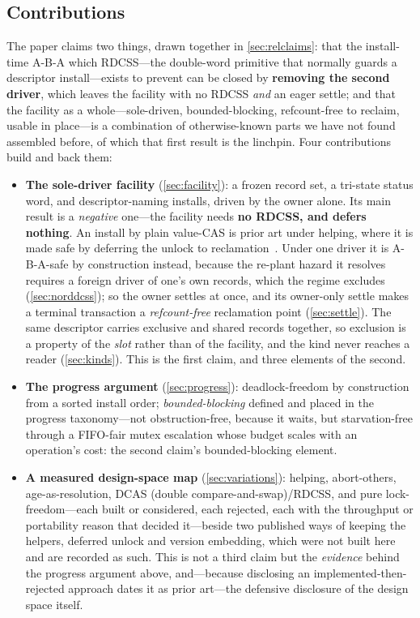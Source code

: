 \documentclass[11pt]{article}
\begin{document}
\subsection*{Contributions}

The paper claims two things, drawn together in \cref{sec:relclaims}: that the
install-time A-B-A which RDCSS---the double-word primitive that normally guards
a descriptor install---exists to prevent can be closed by \textbf{removing the
second driver}, which leaves the facility with no RDCSS \emph{and} an eager
settle; and that the facility as a
whole---sole-driven, bounded-blocking, refcount-free to reclaim, usable in
place---is a combination of otherwise-known parts we have not found assembled
before, of which that first result is the linchpin. Four contributions build and
back them:

\begin{itemize}
\item \textbf{The sole-driver \mcas facility} (\cref{sec:facility}): a frozen record
      set, a tri-state status word, and descriptor-naming installs, driven by
      the owner alone. Its main result is a \emph{negative} one---the facility
      needs \textbf{no RDCSS, and defers nothing}. An install by plain value-CAS
      is prior art under helping, where it is made safe by deferring the unlock
      to reclamation~\citep{guerraoui2020mcas}. Under one driver it is
      A-B-A-safe by construction instead, because
      the re-plant hazard it resolves requires a foreign driver of one's own
      records, which the regime excludes (\cref{sec:norddcss}); so the owner
      settles at once, and its owner-only
      settle makes a terminal transaction a \emph{refcount-free} reclamation point
      (\cref{sec:settle}). The same descriptor carries exclusive and shared
      records together, so exclusion is a property of the \emph{slot} rather than
      of the facility, and the kind never reaches a reader (\cref{sec:kinds}).
      This is the first claim, and three elements of the second.

\item \textbf{The progress argument} (\cref{sec:progress}): deadlock-freedom by
      construction from a sorted install order; \emph{bounded-blocking} defined
      and placed in the progress taxonomy---not obstruction-free, because it
      waits, but starvation-free through a FIFO-fair mutex escalation whose
      budget scales with an operation's cost: the second claim's bounded-blocking
      element.

\item \textbf{A measured design-space map} (\cref{sec:variations}): helping,
      abort-others, age-as-resolution, DCAS (double compare-and-swap)/RDCSS, and
      pure lock-freedom---each built or considered, each rejected, each with the
      throughput or portability reason that decided it---beside two published
      ways of keeping the helpers, deferred unlock and version embedding, which
      were not built here and are recorded as such. This is not a third claim
      but the \emph{evidence} behind the progress argument above, and---because
      disclosing an implemented-then-rejected approach dates it as prior
      art---the defensive disclosure of the design space itself.


\end{itemize}
\end{document}
